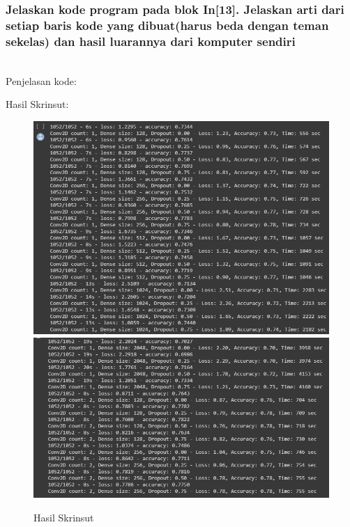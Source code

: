 \subsubsection{Jelaskan kode program pada blok  In[13]. Jelaskan arti dari setiap baris kode yang dibuat(harus beda dengan teman sekelas) dan hasil luarannya dari komputer sendiri}
\hfill\\
Penjelasan kode:

Hasil Skrinsut:
\begin{figure}[H]
	\centering
	\includegraphics[scale=0.5]{figures/1174083/figures7/p13a.png}
	\includegraphics[scale=0.5]{figures/1174083/figures7/p13b.png}
	\caption{Hasil Skrinsut}
\end{figure}


